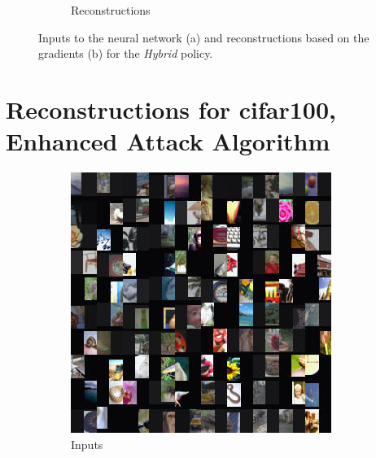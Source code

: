 \begin{figure}[hbt!]
\begin{subfigure}{.49\linewidth}
\caption{Reconstructions}%
\end{subfigure}%
\caption{Inputs to the neural network (a) and reconstructions based on the gradients (b) for the \textit{Hybrid} policy.}
    \label{fig:apprr}
\end{figure}


\clearpage
\section{Reconstructions for cifar100, Enhanced Attack Algorithm}\label{apx:reaa}



\begin{figure}[hbt!]
\begin{subfigure}{.49\linewidth}\centering
\includegraphics[width=\textwidth]{grids/data_cifar100_arch_ResNet20-4_epoch_200_optim_inversed_mode_aug_auglist_3-1-7_rlabel_False_reaugment_translate_clipped1_ORIGINALS.png}
\caption{Inputs}%
\end{subfigure}%
\hfill
\begin{subfigure}{.49\linewidth}\centering

\end{subfigure}
\end{figure}
